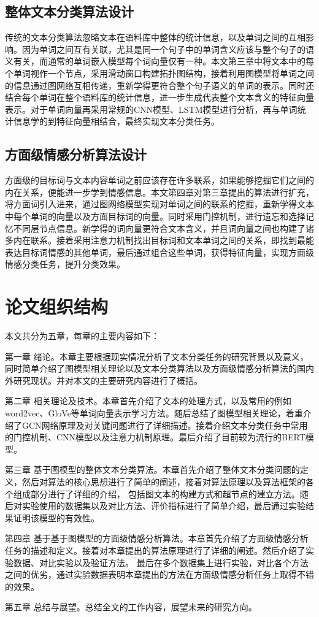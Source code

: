 \subsection{整体文本分类算法设计}
传统的文本分类算法忽略文本在语料库中整体的统计信息，以及单词之间的互相影响。因为单词之间互有关联，尤其是同一个句子中的单词含义应该与整个句子的语义有关，而通常的单词嵌入模型每个词向量仅有一种。本文第三章中将文本中的每个单词视作一个节点，采用滑动窗口构建拓扑图结构，接着利用图模型将单词之间的信息通过图网络互相传递，重新学得更符合整个句子语义的单词的表示。同时还结合每个单词在整个语料库的统计信息，进一步生成代表整个文本含义的特征向量表示。对于单词向量再采用常规的CNN模型、LSTM模型进行分析，再与单词统计信息学的到特征向量相结合，最终实现文本分类任务。
\subsection{方面级情感分析算法设计}
方面级的目标词与文本内容单词之前应该存在许多联系，如果能够挖掘它们之间的内在关系，便能进一步学到情感信息。本文第四章对第三章提出的算法进行扩充，将方面词引入进来，通过图网络模型实现对单词之间的联系的挖掘，重新学得文本中每个单词的向量以及方面目标词的向量。同时采用门控机制，进行遗忘和选择记忆不同层节点信息。新学得的词向量更符合文本含义，并且词向量之间也构建了诸多内在联系。接着采用注意力机制找出目标词和文本单词之间的关系，即找到最能表达目标词情感的其他单词，最后通过组合这些单词，获得特征向量，实现方面级情感分类任务，提升分类效果。
\section{论文组织结构}
本文共分为五章，每章的主要内容如下：

第一章 绪论。本章主要根据现实情况分析了文本分类任务的研究背景以及意义，同时简单介绍了图模型相关理论以及文本分类算法以及方面级情感分析算法的国内外研究现状。并对本文的主要研究内容进行了概括。

第二章 相关理论及技术。本章首先介绍了文本的处理方式，以及常用的例如word2vec、GloVe等单词向量表示学习方法。随后总结了图模型相关理论，着重介绍了GCN网络原理及对关键问题进行了详细描述。接着介绍文本分类任务中常用的门控机制、CNN模型以及注意力机制原理。最后介绍了目前较为流行的BERT模型。

第三章 基于图模型的整体文本分类算法。本章首先介绍了整体文本分类问题的定义，然后对算法的核心思想进行了简单的阐述，接着对算法原理以及算法框架的各个组成部分进行了详细的介绍，
包括图文本的构建方式和超节点的建立方法。随后对实验使用的数据集以及对比方法、评价指标进行了简单介绍，最后通过实验结果证明该模型的有效性。

第四章 基于基于图模型的方面级情感分析算法。本章首先介绍了方面级情感分析任务的描述和定义。接着对本章提出的算法原理进行了详细的阐述。然后介绍了实验数据、对比实验以及验证方法。
最后在多个数据集上进行实验，对比各个方法之间的优劣，通过实验数据表明本章提出的方法在方面级情感分析任务上取得不错的效果。

第五章 总结与展望。总结全文的工作内容，展望未来的研究方向。 
